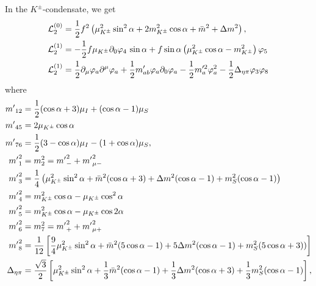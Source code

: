 In the $K^\pm$-condensate, we get
%
\begin{align}
    \label{static three-flavor Lagrangian kaon condensate}
    \mathcal{L}^{(0)}_2 
    & =
    \frac{1}{2}f^2 
    \left(
        \mu_{K^\pm}^2 \sin^2\alpha
        + 2m^2_{K^\pm} \cos\alpha
        + \bar m^2 +\Delta m^2
    \right), \\
    \label{linear three-flavor Lagrangian kaon condensate}
    \mathcal{L}_2^{(1)}
    & 
    =
    - \frac{1}{2}f\mu_{K^\pm}\partial_0\varphi_4 \, \sin\alpha 
    + f\sin\alpha
    \left(
        \mu_{K^\pm}^2 \cos\alpha
        -m_{K^\pm}^2
    \right)\varphi_5\\
    \label{quadratic three-flavor Lagrangian kaon condensate}
    \mathcal{L}_2^{(1)}
    & =
    \frac{1}{2} \partial_\mu \varphi_a \partial^\mu \varphi_a
    + \frac{1}{2}m'_{ab} \varphi_a\partial_0\varphi_a
    - \frac{1}{2}m'^2_{a} \varphi_a^2
    - \frac{1}{2}\Delta_{\eta\pi} \varphi_3\varphi_8
\end{align}
%
where
%
\begingroup
\allowdisplaybreaks
\begin{align}
    {m'}_{12} &= \frac{1}{2}(\cos\alpha + 3)\mu_I + (\cos\alpha - 1)\mu_S \\
    {m'}_{45} &= 2\mu_{K^\pm}\cos\alpha \\
    {m'}_{76} &= \frac{1}{2}(3-\cos\alpha) \mu_I - (1 + \cos\alpha)\mu_S, \\
    {m'}_1^2 & = m_2^2 = {m'}_-^2 + {m'}_{\mu-}^2\\
    {m'}_3^2 
    & = 
    \frac{1}{4}
    \left(
        \mu_{K^\pm}^2 \sin^2\alpha
        + \bar m^2(\cos\alpha + 3)
        + \Delta m^2 (\cos\alpha -1)
        + m_S^2(\cos\alpha - 1)
    \right)\\
    {m'}_4^2 & = m_{K^\pm}^2\cos\alpha -\mu_{K^\pm} \cos^2\alpha \\
    {m'}_5^2 & = m_{K^\pm}^2\cos\alpha -\mu_{K^\pm} \cos 2\alpha \\
    {m'}_6^2 & = m_7^2 = {m'}_+^2 + {m'}_{\mu+}^2\\
    {m'}_8^2
    & =
    \frac{1}{12}
    \left[
        \frac{9}{4}\mu_{K^\pm}^2\sin^2\alpha
        + \bar m^2(5\cos\alpha-1) 
        + 5\Delta m^2(\cos\alpha-1)
        + m_S^2(5\cos\alpha+3))
    \right] \\
    \Delta_{\eta\pi}
    & =
    \frac{\sqrt{3}}{2}
    \left[
        \mu_{K^\pm}^2\sin^2\alpha
        + \frac{1}{3}\bar m^2(\cos\alpha - 1)
        + \frac{1}{3}\Delta m^2(\cos\alpha + 3)
        + \frac{1}{3}m^2_S(\cos\alpha - 1)
    \right],
\end{align}
\endgroup
